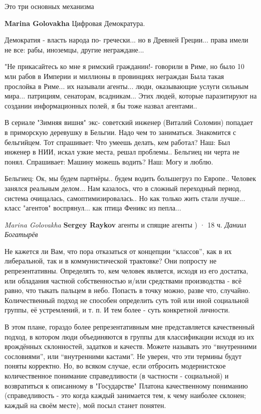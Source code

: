 \begin{itemize}
Это три основных механизма

\textbf{Marina Golovakha} Цифровая Демократура.


Демократия - власть народа по- гречески... но в Древней Греции... права имели
не все: рабы, иноземцы, другие неграждане...

"Не прикасайтесь ко мне я римский гражданин!- говорили в Риме, но было 10 млн
рабов в Империи и миллионы в провинциях неграждан Была такая прослойка в
Риме... их называли агенты... люди, оказывающие услуги сильным мира...
патрициям, сенаторам, всадникам...  Этих людей, которые паразитируют на
создании информационных полей, я бы тоже назвал агентами..

В сериале "Зимняя вишня" экс- советский инженер (Виталий Соломин) попадает в
приморскую деревушку в Бельгии. Надо чем то заниматься. Знакомится с
бельгийцем. Тот спрашивает: Что умеешь делать, кем работал? Наш: Был инженер в
НИИ, искал узкие места, решал проблемы.. Бельгиец ни черта не понял. Спрашивает:
Машину можешь водить? Наш: Могу и люблю.

Бельгиец: Ок, мы будем партнёры.. будем водить большегруз по Европе..
Человек занялся реальным делом...
Нам казалось, что в сложный переходный период, система очищалась, самоптимизировалась..
Но как только жить стали лучше... класс "агентов" воспрянул... как птица Феникс из пепла...

\emph{Marina Golovakha}
\textbf{Sergey Raykov} агенты и спящие агенты )
 · 18 ч.
\emph{Даниил Богатырёв}

Не кажется ли Вам, что пора отказаться от концепции \enquote{классов}, как в их
либеральной, так и в коммунистической трактовке? Они попросту не
репрезентативны. Определять то, кем человек является, исходя из его достатка,
или обладания частной собственностью и/или средствами производства - всё равно,
что тыкать пальцем в небо. Попасть в точку можно, разве что, случайно.
Количественный подход не способен определить суть той или иной социальной
группы, её устремлений, и т. п. И тем более - суть конкретной личности.

В этом плане, гораздо более репрезентативным мне представляется качественный
подход, в котором люди объединяются в группы для классификации исходя из их
врождённых склонностей, задатков и качеств. Можете называть это \enquote{внутренними
сословиями}, или \enquote{внутренними кастами}. Не уверен, что эти термины будут поняты
корректно. Но, во всяком случае, если отбросить модернистское количественное
понимание справедливости (в частности - социальной) и возвратиться к описанному
в "Государстве" Платона качественному пониманию (справедливость - это когда
каждый занимается тем, к чему наиболее склонен; каждый на своём месте), мой
посыл станет понятен.


\end{itemize}
